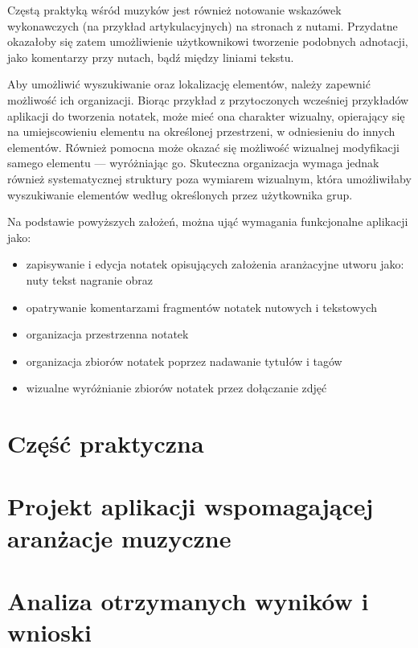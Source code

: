 \documentclass[12pt]{article}
\begin{document}
Częstą praktyką wśród muzyków jest również notowanie wskazówek wykonawczych (na przykład artykulacyjnych)
na stronach z nutami.
Przydatne okazałoby się zatem umożliwienie użytkownikowi tworzenie podobnych adnotacji, jako komentarzy przy nutach,
bądź między liniami tekstu.

Aby umożliwić wyszukiwanie oraz lokalizację elementów, należy zapewnić możliwość ich organizacji.
Biorąc przykład z przytoczonych wcześniej przykładów aplikacji do tworzenia notatek, może mieć ona charakter wizualny,
opierający się na umiejscowieniu elementu na określonej przestrzeni, w odniesieniu do innych elementów.
Również pomocna może okazać się możliwość wizualnej modyfikacji samego elementu — wyróżniając go.
Skuteczna organizacja wymaga jednak również systematycznej struktury poza wymiarem wizualnym, która umożliwiłaby wyszukiwanie
elementów według określonych przez użytkownika grup.

Na podstawie powyższych założeń, można ująć wymagania funkcjonalne aplikacji jako:
\begin{itemize}
	\item zapisywanie i edycja notatek opisujących założenia aranżacyjne utworu jako:
	      \subitem nuty
	      \subitem tekst
	      \subitem nagranie
	      \subitem obraz
	\item opatrywanie komentarzami fragmentów notatek nutowych i tekstowych
	\item organizacja przestrzenna notatek
	\item organizacja zbiorów notatek poprzez nadawanie tytułów i tagów
	\item wizualne wyróżnianie zbiorów notatek przez dołączanie zdjęć
\end{itemize}

\newpage
{}
\section*{Część praktyczna}

\newpage
\section{Projekt aplikacji wspomagającej aranżacje muzyczne}

\newpage
\section{Analiza otrzymanych wyników i wnioski}

\newpage
{}
\printbibliography

\newpage
{}
\listoffigures

\newpage
{}
\listoftables
\end{document}
